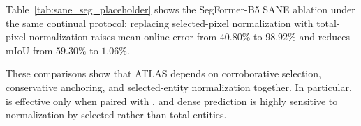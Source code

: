 Table~\ref{tab:sane_seg_placeholder} shows the SegFormer-B5 SANE ablation under the same continual protocol: replacing selected-pixel normalization with total-pixel normalization raises mean online error from $40.80\%$ to $98.92\%$ and reduces mIoU from $59.30\%$ to $1.06\%$.

These comparisons show that ATLAS depends on corroborative selection, conservative anchoring, and selected-entity normalization together. In particular, \care{} is effective only when paired with \core{}, and dense prediction is highly sensitive to normalization by selected rather than total entities.
